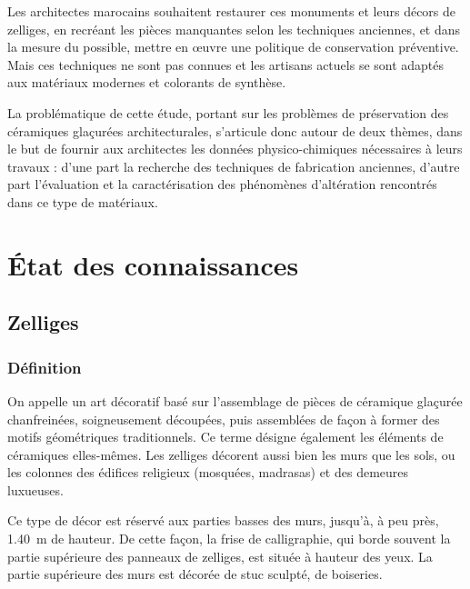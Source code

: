 Les architectes marocains souhaitent restaurer ces monuments et 
leurs décors de zelliges, en recréant les pièces manquantes selon 
les techniques anciennes, et dans la mesure du possible, mettre en 
{\oe}uvre une politique de conservation préventive. Mais ces 
techniques ne sont pas connues et les artisans actuels se sont 
adaptés aux matériaux modernes et colorants de synthèse.

La problématique de cette étude, portant sur les problèmes de 
préservation des céramiques glaçurées architecturales, s'articule 
donc autour de deux thèmes, dans le but de fournir aux architectes 
les données physico-chimiques nécessaires à leurs travaux : d'une 
part la recherche des techniques de fabrication anciennes, d'autre 
part l'évaluation et la caractérisation des phénomènes d'altération 
rencontrés dans ce type de matériaux.

\chapter{État des connaissances}

\section{Zelliges \quad\arabzell}

\subsection{Définition}
On appelle  un art décoratif basé sur l'assemblage 
de pièces de céramique glaçurée chanfreinées, soigneusement 
découpées, puis assemblées de façon à former des motifs géométriques 
traditionnels. Ce terme désigne également les éléments de céramiques 
elles-mêmes. Les zelliges décorent aussi bien les murs que les sols, 
ou les colonnes des édifices religieux (mosquées, madrasas) et des 
demeures luxueuses.

Ce type de décor est réservé aux parties basses des murs, jusqu'à, 
à peu près, \SI{1.40}{\m} de hauteur. De cette façon, la frise de 
calligraphie, qui borde souvent la partie supérieure des panneaux 
de zelliges, est située à hauteur des yeux. La partie supérieure 
des murs est décorée de stuc sculpté, de boiseries.


